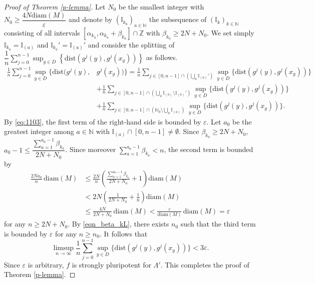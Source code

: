 \documentclass{amsart}
\theoremstyle{definition}
\numberwithin{equation}{section}
\numberwithin{figure}{section}
\begin{document}
\begin{proof}[Proof of Theorem \ref{p-lemma}]
Let $N_0$ be the smallest integer with $N_0\geq \dfrac{4N\mathrm{diam}(M)}{\varepsilon}$ 
and denote by $({\mathbb{I}}_{k_a})_{a\in\mathbb{N}}$ the subsequence of $({\mathbb{I}}_k)_{k\in\mathbb{N}}$ consisting of all 
intervals $[\alpha_{k_a},\alpha_{k_a}+\beta_{k_a}]\cap \mathbb{Z}$ with $\beta_{k_a}\geq 2N+N_0$.
We set simply ${\mathbb{I}}_{k_a}={\mathbb{I}}_{(a)}$ and ${\mathbb{I}}_{k_a}'={\mathbb{I}}_{(a)}'$ 
and consider the splitting of   
$\dfrac{1}{n}\sum _{j=0}^{n-1} \sup_{y\in D}\left\{\mathrm{dist}(g^j(y),g^j(x_g))\right\}$ 
as follows.
\begin{align*}
\frac{1}{n}\sum _{j=0}^{n-1} \sup_{y\in D} \{ \mathrm{dist}(g^j(y),& g^j(x_g)) \} 
=  \frac{1}{n}\sum _{j\in [0,n-1] \cap ( \bigcup_a\mathbb I_{(a)}')} \sup_{y\in D} \{ \mathrm{dist}(g^j(y),g^j(x_g)) \}\\
&+\frac{1}{n}\sum _{j\in [0,n-1] \cap ( \bigcup_a\mathbb I_{(a)}\setminus \mathbb I_{(a)}')} 
\sup_{y\in D}\{\mathrm{dist}(g^j(y),g^j(x_g))\}\\
&+\frac{1}{n}\sum _{j\in [0,n-1] \cap (\mathbb{N}_{0}\setminus \bigcup_{a}\mathbb{I}_{(a)})} 
\sup_{y\in D}\{\mathrm{dist}(g^j(y),g^j(x_g))\}.
\end{align*}
By \eqref{eq:1103}, the first term of the right-hand side is bounded by $\varepsilon$.
Let $a_0$ be the greatest integer among $a\in \mathbb{N}$ with ${\mathbb{I}}_{(a)}\cap [0,n-1]\neq \emptyset$.
Since $\beta_{k_a}\geq 2N+N_0$, $a_0-1\leq \dfrac{\sum_{a=1}^{a_0-1}\beta_{k_a}}{2N+N_0}$.
Since moreover $\sum_{a=1}^{a_0-1}\beta_{k_a}<n$, 
the second term is bounded by 
\begin{align*}
\frac{2Na_0}{n}\,\mathrm{diam}(M)&\leq 
\frac{2N}{n}\left(\frac{\sum_{a=1}^{a_0-1}\beta_{k_a}}{2N+N_0}+1\right)\mathrm{diam}(M)\\
&< 
2N\left(\frac1{2N+N_0}+\frac1{n}\right)\mathrm{diam}(M)\\
&\leq \frac{4N}{2N+N_0}\,\mathrm{diam}(M)
< \frac{\varepsilon}{\mathrm{diam}(M)}\,\mathrm{diam}(M)=\varepsilon
\end{align*}
for any $n\geq 2N+N_0$.
By \eqref{eqn_beta_kL}, 
there exists $n_0$ such that the third term is bounded 
by $\varepsilon$ for any $n\geq n_0$.
It follows that
$$
\limsup_{n\rightarrow\infty} 
\frac1{n} \sum_{j=0}^{n-1}\sup _{y\in D}\{\mathrm{dist}\left(g^j(y),g^j(x_g)\right)\}< 3\varepsilon.
$$
Since $\varepsilon$ is arbitrary, $f$ is strongly pluripotent for $\Lambda'$.
This completes the proof of Theorem \ref{p-lemma}.
\end{proof}
\end{document}
